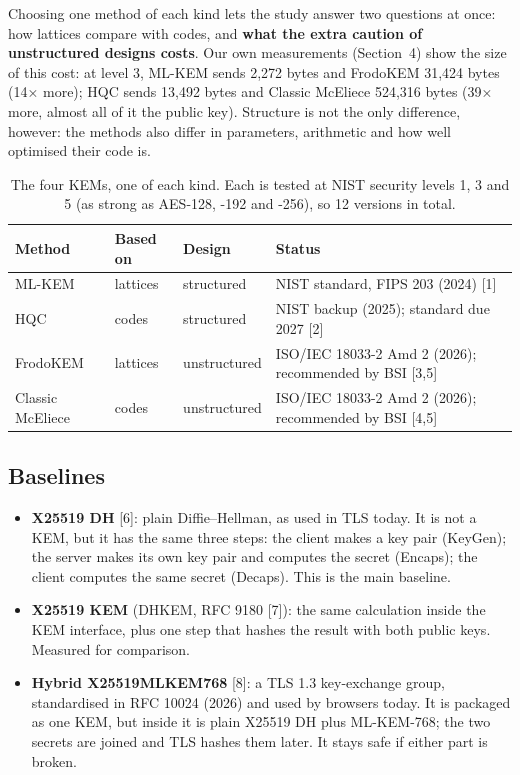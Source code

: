 \documentclass[11pt,a4paper]{article}
\begin{document}
Choosing one method of each kind lets the study answer two questions at once: how lattices compare with codes,
and \textbf{what the extra caution of unstructured designs costs}. Our own measurements (Section~4) show the
size of this cost: at level 3, ML-KEM sends 2,272 bytes and FrodoKEM 31,424 bytes (14× more); HQC sends 13,492
bytes and Classic McEliece 524,316 bytes (39× more, almost all of it the public key). Structure is not the
only difference, however: the methods also differ in parameters, arithmetic and how well optimised their code is.

\begin{table}[H]
\centering\small
\begin{tabular}{@{}llll@{}}
\toprule
Method & Based on & Design & Status \\
\midrule
ML-KEM & lattices & structured & NIST standard, FIPS 203 (2024) [1] \\
HQC & codes & structured & NIST backup (2025); standard due 2027 [2] \\
FrodoKEM & lattices & unstructured & ISO/IEC 18033-2 Amd 2 (2026); recommended by BSI [3,5] \\
Classic McEliece & codes & unstructured & ISO/IEC 18033-2 Amd 2 (2026); recommended by BSI [4,5] \\
\bottomrule
\end{tabular}
\caption{The four KEMs, one of each kind. Each is tested at NIST security levels 1, 3 and 5 (as strong as AES-128, -192 and
-256), so 12 versions in total.}
\end{table}

\subsection{Baselines}
\begin{itemize}
  \item \textbf{X25519 DH} [6]: plain Diffie--Hellman, as used in TLS today. It is not a KEM, but it has the same
  three steps: the client makes a key pair (KeyGen); the server makes its own key pair and computes the secret
  (Encaps); the client computes the same secret (Decaps). This is the main baseline.
  \item \textbf{X25519 KEM} (DHKEM, RFC 9180 [7]): the same calculation inside the KEM interface, plus one step
  that hashes the result with both public keys. Measured for comparison.
  \item \textbf{Hybrid X25519MLKEM768} [8]: a TLS 1.3 key-exchange group, standardised in RFC 10024 (2026) and
  used by browsers today. It is packaged as one KEM, but inside it is
  plain X25519 DH plus ML-KEM-768; the two secrets are joined and TLS hashes them later. It stays safe if
  either part is broken.
\end{itemize}
\end{document}
